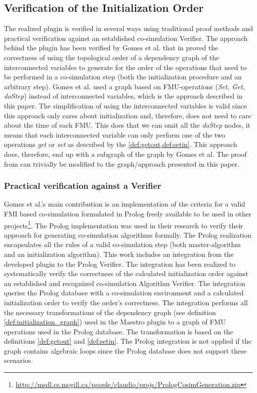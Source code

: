 \subsection{Verification of the Initialization Order}
The realized plugin is verified in several ways using traditional proof methods and practical verification against an established co-simulation Verifier. The approach behind the plugin has been verified by Gomes et al. that in \cite{gomes_lucio_vangheluwe_2019} proved the correctness of using the topological order of a dependency graph of the interconnected variables to generate for the order of the operations that need to be performed in a co-simulation step (both the initialization procedure and an arbitrary step). Gomes et al. used a graph based on FMU-operations (\textit{Set, Get, doStep}) instead of interconnected variables, which is the approach described in this paper. The simplification of using the interconnected variables is valid since this approach only cares about initialization and, therefore, does not need to care about the time of each FMU. This does that we can omit all the \textit{doStep} nodes, it means that each interconnected variable can only perform one of the two operations \textit{get} or \textit{set} as described by the \cref{def:getout,def:setin}.
This approach does, therefore, end up with a subgraph of the graph by Gomes et al. The proof from \cite{gomes_lucio_vangheluwe_2019} can trivially be modified to the graph/approach presented in this paper.

\subsubsection{Practical verification against a Verifier} 
Gomes et al.'s main contribution is an implementation of the criteria for a valid FMI based co-simulation formulated in Prolog freely available to be used in other projects\footnote{\url{http://msdl.cs.mcgill.ca/people/claudio/projs/PrologCosimGeneration.zip}}. The Prolog implementation was used in their research to verify their approach for generating co-simulation algorithms formally. The Prolog realization encapsulates all the rules of a valid co-simulation step (both master-algorithm and an initialization algorithm). 
This work includes an integration from the developed plugin to the Prolog Verifier. The integration has been realized to systematically verify the correctness of the calculated initialization order against an established and recognized co-simulation Algorithm Verifier. The integration queries the Prolog database with a co-simulation environment and a calculated initialization order to verify the order's correctness. The integration performs all the necessary transformations of the dependency graph (see definition \ref{def:initialization_graph}) used in the Maestro plugin to a graph of FMU operations used in the Prolog database. The transformation is based on the definitions \ref{def:getout} and \ref{def:setin}. The Prolog integration is not applied if the graph contains algebraic loops since the Prolog database does not support these scenarios.
